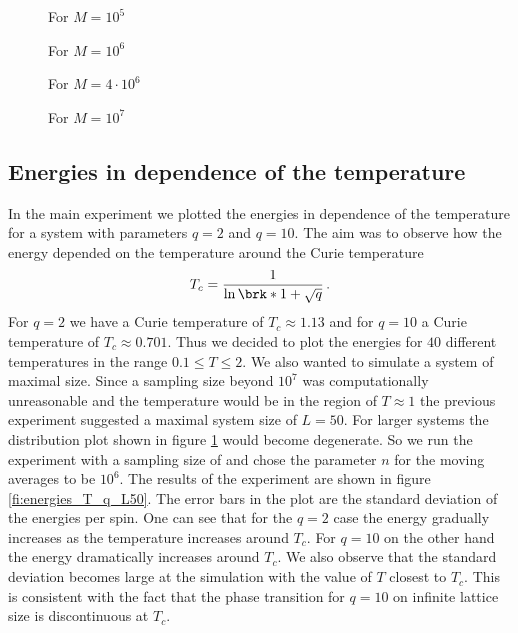 \begin{figure}
\begin{minipage}[b]{0.45\textwidth}
\centering

\caption{For $M=10^5$}
\label{pl:Maxwell_distribution_0}
\end{minipage}
\hfill
\begin{minipage}[b]{0.45\textwidth}
\centering

\caption{For $M=10^6$}
\label{pl:Maxwell_distribution_1}
\end{minipage}
\begin{minipage}[b]{0.45\textwidth}
\vspace*{1cm}
\centering

\caption{For $M=4\cdot10^6$}
\label{pl:Maxwell_distribution_2}
\end{minipage}
\hfill
\begin{minipage}[b]{0.45\textwidth}
\centering

\caption{For $M=10^7$}
\label{pl:Maxwell_distribution_3}
\end{minipage}
\end{figure}

\subsection*{Energies in dependence of the temperature}

In the main experiment we plotted the energies in dependence of the temperature for a system with parameters $q=2$ and $q=10$. The aim was to observe how the energy depended on the temperature around the Curie temperature 
\begin{align*}
	T_c = \frac{1}{\ln\brk*{1+\sqrt{q}}}\,.
\end{align*}
For $q=2$ we have a Curie temperature of $T_c\approx 1.13$ and for $q=10$ a Curie temperature of $T_c\approx0.701$. Thus we decided to plot the energies for $40$ different temperatures in the range $0.1\leq T\leq 2$. We also wanted to simulate a system of maximal size. Since a sampling size beyond $10^7$ was computationally unreasonable and the temperature would be in the region of $T\approx1$ the previous experiment suggested a maximal system size of $L=50$. For larger systems the distribution plot shown in figure \ref{pl:Maxwell_distribution_3} would become degenerate.
So we run the experiment with a sampling size of  and chose the parameter $n$ for the moving averages to be $10^6$. The results of the experiment are shown in figure \ref{fi:energies_T_q_L50}. The error bars in the plot are the standard deviation of the energies per spin. One can see that for the $q=2$ case the energy gradually increases as the temperature increases around $T_c$. For $q=10$ on the other hand the energy dramatically increases around $T_c$. We also observe that the standard deviation becomes large at the simulation with the value of $T$ closest to $T_c$. This is consistent with the fact that the phase transition for $q=10$ on infinite lattice size is discontinuous at $T_c$.

